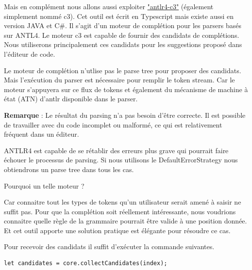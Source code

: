 \documentclass[
    iict, %
    il, %
]{heig-tb}
\begin{document}
Mais en complément nous allons aussi exploiter \href{https://github.com/mike-lischke/antlr4-c3}{"antlr4-c3"} (également simplement nommé c3).
Cet outil est écrit en Typescript mais existe aussi en version JAVA et C\#.
Il s'agit d'un moteur de complétion pour les parsers basés sur ANTL4. Le moteur c3 est capable de fournir des candidats de complétions.
Nous utiliserons principalement ces candidats pour les suggestions proposé dans l'éditeur de code.



Le moteur de complétion n'utlise pas le parse tree pour proposer des candidats. Mais l'exécution du parser est nécessaire pour remplir le token stream.
Car le moteur s'appuyera sur ce flux de tokens et également du mécanisme de machine à état (ATN) d'antlr disponible dans le parser.

\textbf{Remarque} : Le résultat du parsing n'a pas besoin d'être correcte. Il est possible de travailler avec du code incomplet ou malformé, ce qui est relativement fréquent dans un éditeur.

ANTLR4 est capable de se rétablir des erreurs plus grave qui pourrait faire échouer le processus de parsing.
Si nous utilisons le DefaultErrorStrategy nous obtiendrons un parse tree dans tous les cas.

Pourquoi un telle moteur ?

Car connaitre tout les types de tokens qu'un utilisateur serait amené à saisir ne suffit pas. Pour que la complétion soit réellement intéressante, nous voudrions connaitre quelle règle de la grammaire pourrait être valide à une position donnée.
Et cet outil apporte une solution pratique est élégante pour résoudre ce cas.





Pour recevoir des candidats il suffit d'exécuter la commande suivantes.

\begin{lstlisting}[frame=single]
    let candidates = core.collectCandidates(index);
\end{lstlisting}
\end{document}
